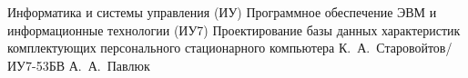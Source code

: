 \makecourseworktitle
{Информатика и системы управления (ИУ)}
{Программное обеспечение ЭВМ и информационные технологии (ИУ7)}
{Проектирование базы данных характеристик комплектующих персонального стационарного компьютера}
{К.~А.~Старовойтов/ИУ7-53БВ}
{А.~А.~Павлюк}
{}{}{}
